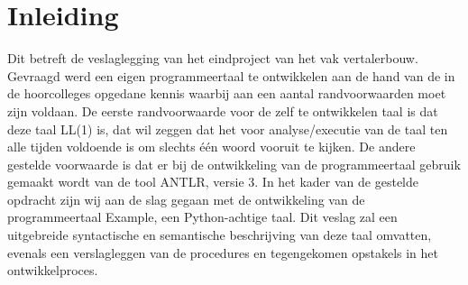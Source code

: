 \chapter{Inleiding}
Dit betreft de veslaglegging van het eindproject van het vak vertalerbouw. Gevraagd werd een eigen programmeertaal te ontwikkelen aan de hand van de in de hoorcolleges opgedane kennis waarbij aan een aantal randvoorwaarden moet zijn voldaan. De eerste randvoorwaarde voor de zelf te ontwikkelen taal is dat deze taal LL(1) is, dat wil zeggen dat het voor analyse/executie van de taal ten alle tijden voldoende is om slechts \'{e}\'{e}n woord vooruit te kijken. De andere gestelde voorwaarde is dat er bij de ontwikkeling van de programmeertaal gebruik gemaakt wordt van de tool ANTLR, versie 3. In het kader van de gestelde opdracht zijn wij aan de slag gegaan met de ontwikkeling van de programmeertaal Example, een Python-achtige taal. Dit veslag zal een uitgebreide syntactische en semantische beschrijving van deze taal omvatten, evenals een verslagleggen van de procedures en tegengekomen opstakels in het ontwikkelproces.

